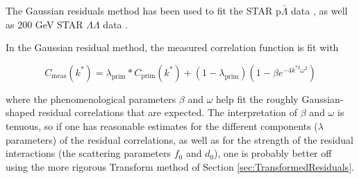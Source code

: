 The Gaussian residuals method has been used  to fit the STAR p$\bar{\Lambda}$ data \cite{Shapoval:2014yha}, as well as 200 GeV STAR $\Lambda\Lambda$ data \cite{Adamczyk:2014vca}.

In the Gaussian residual method, the measured correlation function is fit with 

\begin{equation}
\label{eq:GaussianResiduals}
C_{\mathrm{meas}}(k^*) = \lambda_{\mathrm{prim}}*C_{\mathrm{prim}}(k^*)+(1-\lambda_{\mathrm{prim}})(1-\beta  e^{-4k^{*2}\omega^2})
\end{equation}

where the phenomenological parameters $\beta$ and $\omega$ help fit the roughly Gaussian-shaped residual correlations that are expected.
The interpretation of $\beta$ and $\omega$ is tenuous, so if one has reasonable estimates for the different components ($\lambda$ parameters) of the residual correlations, as well as for the strength of the residual interactions (the scattering parameters $f_0$ and $d_0$), one is probably better off using the more rigorous Transform method of Section \ref{sec:TransformedResiduals}.





